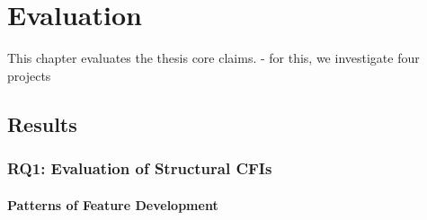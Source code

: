 \chapter{Evaluation}\label{ch:evaluation}

This chapter evaluates the thesis core claims.
- for this, we investigate four projects

\section{Results}\label{sec:results}

\subsection*{\textbf{RQ1: Evaluation of Structural CFIs}}\label{sec:eval_struc_cfis}

\subsubsection*{Patterns of Feature Development}\label{sec:eval_feature_development}

